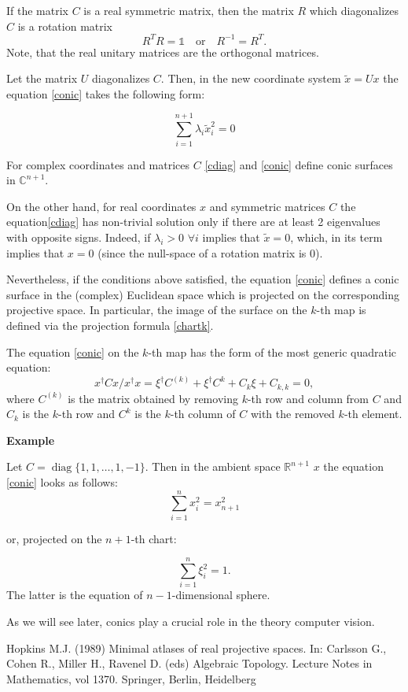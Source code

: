 \documentclass[a4paper,10pt]{article}
\newcommand{\diag}{\mathop{\mathrm{diag}}}
\begin{document}
If the matrix $C$ is a real symmetric matrix, then the matrix $R$ which diagonalizes $C$ is a rotation matrix
\begin{equation}
 R^TR=\mathbb{1}\quad\text{or}\quad R^{-1} = R^{T}.
\end{equation}
Note, that the real unitary matrices are the orthogonal matrices.

Let the matrix $U$ diagonalizes $C$. Then, in the new coordinate system  $\tilde{x} = U x$ the equation \eqref{conic} takes the following form:

\begin{equation}
 \sum\limits_{i=1}^{n+1} \lambda_i \tilde{x}_i^2 = 0\label{cdiag}
\end{equation}

For complex coordinates and matrices $C$ \eqref{cdiag} and \eqref{conic} define conic surfaces in $\mathbb{C}^{n+1}$. 

On the other hand, for real coordinates $x$ and symmetric matrices $C$ the equation\eqref{cdiag} has non-trivial solution only if there are at least 2 eigenvalues with opposite signs. Indeed, if $\lambda_i >0$ $\forall i$ implies that $\tilde{x} = 0$, which, in its term implies that $x = 0$ (since the null-space of a rotation matrix is 0).

Nevertheless, if the conditions above satisfied, the equation \eqref{conic} defines a conic surface in the (complex) Euclidean space which is projected on the corresponding projective space. In particular, the image of the surface on the $k$-th map is defined via the projection formula \eqref{chartk}.

The equation \eqref{conic} on the $k$-th map has the form of the most generic quadratic equation:
\begin{equation}
 x^\dag C x / x^\dag x = \xi^\dag C^{(k)} + \xi^\dag C^k + C_k \xi + C_{k,k}= 0,
\end{equation}
where $C^{(k)}$ is the matrix obtained by removing $k$-th row and column from $C$ and $C_k$ is the $k$-th row and $C^k$ is the $k$-th column of $C$ with the removed $k$-th element. 

{\bf Example}

Let $C = \diag{\{1,1,\ldots,1,-1\}}$. Then in the ambient space $\mathbb{R}^{n+1}$ $x$ the equation \eqref{conic} looks as follows:
\begin{equation}
 \sum\limits_{i=1}^n x_i^2 = x_{n+1}^2
\end{equation}

or, projected on the $n+1$-th chart:

\begin{equation}
\sum\limits_{i=1}^n \xi_i^2  = 1.
\end{equation}
The latter is the equation of $n-1$-dimensional sphere.

As we will see later, conics play a crucial role in the theory computer vision.


\begin{thebibliography}{1}
 Hopkins M.J. (1989) Minimal atlases of real projective spaces. In: Carlsson G., Cohen R., Miller H., Ravenel D. (eds) Algebraic Topology. Lecture Notes in Mathematics, vol 1370. Springer, Berlin, Heidelberg
\end{thebibliography}
\end{document}
